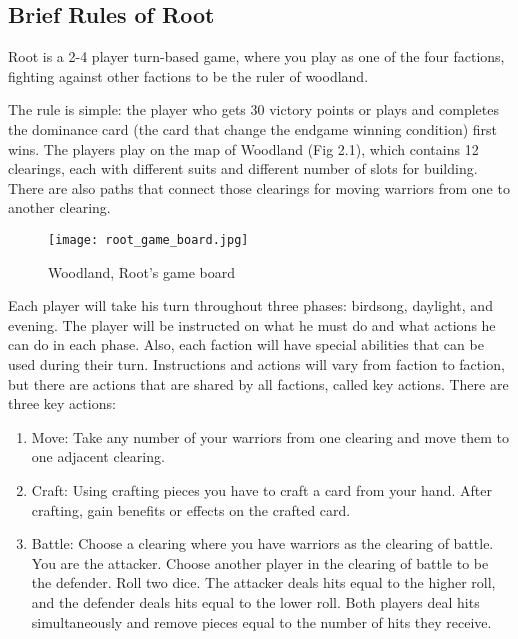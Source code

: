 \subsection{Brief Rules of Root} \label{brief-rules-of-root}
Root is a 2-4 player turn-based game, where you play as one of the four factions, fighting against other factions to be the ruler of woodland.

The rule is simple: the player who gets 30 victory points or plays and completes the dominance card (the card that change the endgame winning condition) first wins. The players play on the map of Woodland (Fig 2.1), which contains 12 clearings, each with different suits and different number of slots for building. There are also paths that connect those clearings for moving warriors from one to another clearing.

\begin{figure}
  \begin{center}
    \texttt{[image: root\_game\_board.jpg]}
  \end{center}
  \caption{Woodland, Root's game board}
  \label{fig:root-game-board}
\end{figure}

Each player will take his turn throughout three phases: birdsong, daylight, and evening. The player will be instructed on what he must do and what actions he can do in each phase. Also, each faction will have special abilities that can be used during their turn. Instructions and actions will vary from faction to faction, but there are actions that are shared by all factions, called key actions. There are three key actions:

\begin{enumerate}
  \item Move: Take any number of your warriors from one clearing and move them to one adjacent clearing.
  \item Craft: Using crafting pieces you have to craft a card from your hand. After crafting, gain benefits or effects on the crafted card.
  \item Battle: Choose a clearing where you have warriors as the clearing of battle. You are the attacker. Choose another player in the clearing of battle to be the defender. Roll two dice. The attacker deals hits equal to the higher roll, and the defender deals hits equal to the lower roll. Both players deal hits simultaneously and remove pieces equal to the number of hits they receive.
\end{enumerate}


